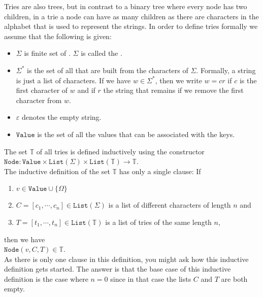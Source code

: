 Tries are also trees, but in contrast to a binary tree where every node has two children, in a trie a
node can have as many children as there are characters in the alphabet that is used to represent the
strings.  In order to define tries formally we assume that the following is given:
\begin{itemize}
\item $\Sigma$ is finite set of . $\Sigma$ is called the
      . 
\item $\Sigma^*$ is the set of all  that are built from the characters of $\Sigma$.
      Formally, a string is just a list of characters.  If we have $w \in \Sigma^*$, then we write $w = cr$
      if $c$ is the first character of $w$ and if $r$ the string that remains if we remove the first
      character from $w$.
\item $\varepsilon$ denotes the empty string.
\item $\texttt{Value}$ is the set of all the values that can be associated with the keys.  
\end{itemize}
The set $\mathbb{T}$ of all tries is defined inductively using the constructor \\[0.2cm]
\hspace*{1.3cm} 
$\texttt{Node}: \texttt{Value} \times \texttt{List}(\Sigma) \times
\texttt{List}(\mathbb{T}) \rightarrow \mathbb{T}$. 
\\[0.2cm]
The inductive definition of the set $\mathbb{T}$ has only a single clause: If
\begin{enumerate}
\item $v \in \texttt{Value} \cup \{\Omega\}$
\item $C = [c_1, \cdots, c_n] \in \texttt{List}(\Sigma)$ is a list of different characters of length
      $n$ and
\item $T = [t_1, \cdots, t_n] \in \texttt{List}(\mathbb{T})$ is a list of  tries of the same length $n$, 
\end{enumerate}
then we have 
\\[0.2cm]
\hspace*{1.3cm}  $\texttt{Node}(v, C, T) \in \mathbb{T}$.  
\\[0.2cm]
As there is only one clause in this definition, you might ask how this inductive definition gets started.
The answer is that the base case of this inductive definition is the case where
$n=0$ since in that case the lists  $C$ and $T$ are both empty.

